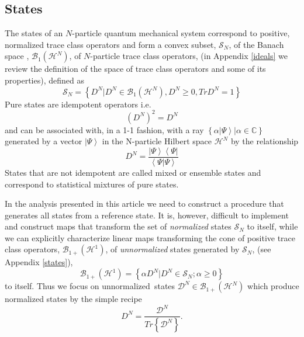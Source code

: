\documentclass[aps,preprint]{revtex4}%
\begin{document}
\subsection{States}

The states of an $N$-particle quantum mechanical system correspond to
positive, normalized trace class operators and form a convex subset,
$\mathcal{S}_{N}$, of the Banach space \cite{banach}, $\mathcal{B}_{1}\left(
\mathcal{H}^{N}\right)  $, of $N$-particle trace class operators, (in Appendix
\ref{ideals} we review the definition of the space of trace class operators
and some of its properties), defined as%
\begin{equation}
\mathcal{S}_{N}=\left\{  D^{N}|D^{N}\in\mathcal{B}_{1}\left(  \mathcal{H}%
^{N}\right)  ,D^{N}\geq0,TrD^{N}=1\right\}
\end{equation}
Pure states are idempotent operators i.e.
\begin{equation}
\left(  D^{N}\right)  ^{2}=D^{N}%
\end{equation}
and can be associated with, in a 1-1 fashion, with a ray $\left\{
\alpha\left\vert \Psi\right\rangle |\alpha\in\mathbb{C}\right\}  $ generated
by a vector $\left\vert \Psi\right\rangle $ in the N-particle Hilbert space
$\mathcal{H}^{N}$ by the relationship
\begin{equation}
D^{N}=\frac{\left\vert \Psi\right\rangle \left\langle \Psi\right\vert
}{\left\langle \Psi|\Psi\right\rangle }%
\end{equation}
States that are not idempotent are called mixed or ensemble states and
correspond to statistical mixtures of pure states.

In the analysis presented in this article we need to construct a procedure
that generates all states from a reference state. It is, however, difficult to
implement and construct maps that transform the set of \textit{normalized
}states $\mathcal{S}_{N}$ to itself, while we can explicitly characterize
linear maps transforming the cone of positive trace class operators,
$\mathcal{B}_{1+}\left(  \mathcal{H}^{1}\right)  $, of \textit{unnormalized
}states generated by $\mathcal{S}_{N}$, (see Appendix \ref{states}),
\begin{equation}
\mathcal{B}_{1+}\left(  \mathcal{H}^{1}\right)  =\left\{  \alpha D^{N}%
|D^{N}\in\mathcal{S}_{N};\alpha\geq0\right\}
\end{equation}
to itself. Thus we focus on unnormalized\textit{\ }states $\mathcal{D}^{N}%
\in\mathcal{B}_{1+}\left(  \mathcal{H}^{N}\right)  $ which produce normalized
states by the simple recipe
\begin{equation}
D^{N}=\frac{\mathcal{D}^{N}}{Tr\left\{  \mathcal{D}^{N}\right\}  }.
\end{equation}
\end{document}
